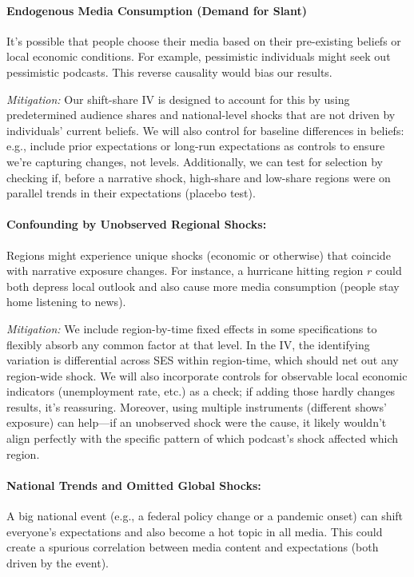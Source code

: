\documentclass[12pt]{article}
\begin{document}
\paragraph{Endogenous Media Consumption (Demand for Slant)}
It's possible that people choose their media based on their pre-existing beliefs or local economic conditions. For example, pessimistic individuals might seek out pessimistic podcasts. This reverse causality would bias our results.

\textit{Mitigation:} Our shift-share IV is designed to account for this by using predetermined audience shares and national-level shocks that are not driven by individuals' current beliefs. We will also control for baseline differences in beliefs: e.g., include prior expectations or long-run expectations as controls to ensure we're capturing changes, not levels. Additionally, we can test for selection by checking if, before a narrative shock, high-share and low-share regions were on parallel trends in their expectations (placebo test).

\paragraph{Confounding by Unobserved Regional Shocks:} Regions might experience unique shocks (economic or otherwise) that coincide with narrative exposure changes. For instance, a hurricane hitting region $r$ could both depress local outlook and also cause more media consumption (people stay home listening to news).

\textit{Mitigation:} We include region-by-time fixed effects in some specifications to flexibly absorb any common factor at that level. In the IV, the identifying variation is differential across SES within region-time, which should net out any region-wide shock. We will also incorporate controls for observable local economic indicators (unemployment rate, etc.) as a check; if adding those hardly changes results, it's reassuring. Moreover, using multiple instruments (different shows' exposure) can help—if an unobserved shock were the cause, it likely wouldn't align perfectly with the specific pattern of which podcast's shock affected which region.

\paragraph{National Trends and Omitted Global Shocks:} A big national event (e.g., a federal policy change or a pandemic onset) can shift everyone's expectations and also become a hot topic in all media. This could create a spurious correlation between media content and expectations (both driven by the event).
\end{document}
